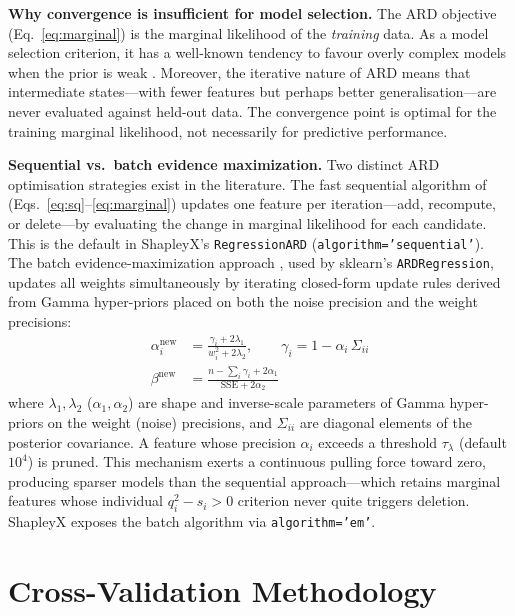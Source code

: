 \documentclass[11pt,a4paper]{article}
\begin{document}
\textbf{Why convergence is insufficient for model selection.} The ARD objective (Eq.~\ref{eq:marginal}) is the marginal likelihood of the \emph{training} data. As a model selection criterion, it has a well-known tendency to favour overly complex models when the prior is weak \citep{mackay1992}. Moreover, the iterative nature of ARD means that intermediate states---with fewer features but perhaps better generalisation---are never evaluated against held-out data. The convergence point is optimal for the training marginal likelihood, not necessarily for predictive performance.

\textbf{Sequential vs.\ batch evidence maximization.} Two distinct ARD optimisation strategies exist in the literature.  The fast sequential algorithm of \citet{tipping2003} (Eqs.~\ref{eq:sq}--\ref{eq:marginal}) updates one feature per iteration---add, recompute, or delete---by evaluating the change in marginal likelihood for each candidate.  This is the default in ShapleyX's \texttt{RegressionARD} (\texttt{algorithm='sequential'}).  The batch evidence-maximization approach \citep{mackay1992}, used by sklearn's \texttt{ARDRegression}, updates all weights simultaneously by iterating closed-form update rules derived from Gamma hyper-priors placed on both the noise precision and the weight precisions:
\begin{align}
\alpha_i^{\text{new}} &= \frac{\gamma_i + 2\lambda_1}{w_i^2 + 2\lambda_2}, \qquad
\gamma_i = 1 - \alpha_i \,\Sigma_{ii} \\
\beta^{\text{new}} &= \frac{n - \sum_i \gamma_i + 2\alpha_1}{\text{SSE} + 2\alpha_2}
\end{align}
where $\lambda_1,\lambda_2$ ($\alpha_1,\alpha_2$) are shape and inverse-scale parameters of Gamma hyper-priors on the weight (noise) precisions, and $\Sigma_{ii}$ are diagonal elements of the posterior covariance.  A feature whose precision $\alpha_i$ exceeds a threshold $\tau_\lambda$ (default $10^4$) is pruned.  This mechanism exerts a continuous pulling force toward zero, producing sparser models than the sequential approach---which retains marginal features whose individual $q_i^2 - s_i > 0$ criterion never quite triggers deletion.  ShapleyX exposes the batch algorithm via \texttt{algorithm='em'}.

\section{Cross-Validation Methodology}
\end{document}
